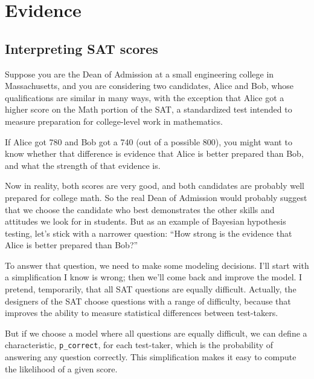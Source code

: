 \documentclass[12pt]{book}
\theoremstyle{exercise}
\begin{document}
\chapter{Evidence}
\label{evidence}


\section{Interpreting SAT scores}

Suppose you are the Dean of Admission at a small engineering
college in Massachusetts, and you are considering two candidates,
Alice and Bob, whose qualifications are similar in many ways,
with the exception that Alice got a higher score on the Math
portion of the SAT, a standardized test intended to measure
preparation for college-level work in mathematics.

If Alice got 780 and Bob got a 740 (out of a possible 800), you might
want to know whether that difference is evidence that Alice is better
prepared than Bob, and what the strength of that evidence is.

Now in reality, both scores are very good, and both 
candidates are probably well prepared for college math.  So
the real Dean of Admission would probably suggest that we choose
the candidate who best demonstrates the other skills and
attitudes we look for in students.  But as an example of
Bayesian hypothesis testing, let's stick with a narrower question:
``How strong is the evidence that Alice is better prepared
than Bob?''

To answer that question, we need to make some modeling decisions.
I'll start with a simplification I know is wrong; then we'll come back
and improve the model.  I pretend, temporarily, that
all SAT questions are equally difficult.  Actually, the designers of
the SAT choose questions with a range of difficulty, because that
improves the ability to measure statistical differences between
test-takers.

But if we choose a model where all questions are equally difficult, we
can define a characteristic, \verb"p_correct", for each test-taker,
which is the probability of answering any question correctly.  This
simplification makes it easy to compute the likelihood of a given
score.
\end{document}

